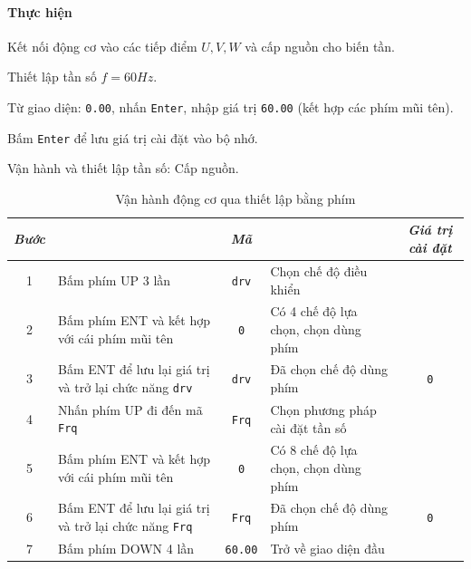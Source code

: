 \documentclass[13pt,a4paper]{extarticle}
\begin{document}
\paragraph{Thực hiện}
\begin{list}{--}{}
\item Kết nối động cơ vào các tiếp điểm $U, V, W$ và cấp nguồn cho biến tần.
\item Thiết lập tần số $f = 60Hz$.
\begin{list}{+}{}
\item Từ giao diện: \verb|0.00|, nhấn \verb|Enter|, nhập giá trị \verb|60.00| (kết hợp các phím mũi tên).
\item Bấm \verb|Enter| để lưu giá trị cài đặt vào bộ nhớ.
\end{list}
\item Vận hành và thiết lập tần số: Cấp nguồn.
\begin{table}[!h]
\begin{center}
\begin{longtable}{|c|p{5cm}|c|p{5cm}|c|} \hline
\textit{Bước} & \centering{Lệnh} & \textit{Mã} & \centering{\textit{Mô tả}} & \textit{Giá trị cài đặt} \\ \hline
1 & Bấm phím UP 3 lần & \verb|drv| & Chọn chế độ điều khiển & \\ \hline
2 & Bấm phím ENT và kết hợp với cái phím mũi tên & \verb|0| & Có 4 chế độ lựa chọn, chọn dùng phím &  \\ \hline
3 & Bấm ENT để lưu lại giá trị và trở lại chức năng \verb|drv| & \verb|drv| & Đã chọn chế độ dùng phím & \verb|0| \\ \hline
4 & Nhấn phím UP đi đến mã \verb|Frq| & \verb|Frq| & Chọn phương pháp cài đặt tần số & \\ \hline
5 & Bấm phím ENT và kết hợp với cái phím mũi tên & \verb|0| & Có 8 chế độ lựa chọn, chọn dùng phím &  \\ \hline
6 & Bấm ENT để lưu lại giá trị và trở lại chức năng \verb|Frq| & \verb|Frq| & Đã chọn chế độ dùng phím & \verb|0| \\ \hline
7 & Bấm phím DOWN 4 lần & \verb|60.00| & Trở về giao diện đầu & \\ \hline
\end{longtable}
\end{center}
\caption{Vận hành động cơ qua thiết lập bằng phím}
\end{table}


\end{list}
\end{document}
